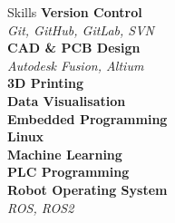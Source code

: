 \documentclass{custom-resume}
\begin{document}
\begin{minipage}[t]{0.25\textwidth}
\begin{section*}{Skills}
    \textbf{Version Control} \\[2pt]
    \textit{Git, GitHub, GitLab, SVN} \\[8pt]

    \textbf{CAD \& PCB Design} \\[2pt]
    \textit{Autodesk Fusion, Altium} \\[8pt]

    \textbf{3D Printing} \\[8pt]

    \textbf{Data Visualisation} \\[8pt]

    \textbf{Embedded Programming} \\[8pt]

    \textbf{Linux} \\[8pt]

    \textbf{Machine Learning} \\[8pt]

    \textbf{PLC Programming} \\[8pt]

    \textbf{Robot Operating System} \\[2pt]
    \textit{ROS, ROS2}
  \end{section*}

\end{minipage}%
\hspace{0.06\textwidth}%
\end{document}
